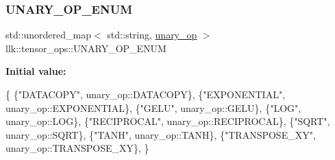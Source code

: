 \subsubsection{\texorpdfstring{U\+N\+A\+R\+Y\+\_\+\+O\+P\+\_\+\+E\+N\+UM}{UNARY\_OP\_ENUM}}
{\footnotesize\ttfamily std\+::unordered\+\_\+map$<$ std\+::string, \hyperlink{namespacellk_1_1tensor__ops_a5fae70cbcf6cd7aadca4a04278614633}{unary\+\_\+op} $>$ llk\+::tensor\+\_\+ops\+::\+U\+N\+A\+R\+Y\+\_\+\+O\+P\+\_\+\+E\+N\+UM}

{\bfseries Initial value\+:}
\begin{DoxyCode}
\{
    \{\textcolor{stringliteral}{"DATACOPY"}, unary\_op::DATACOPY\},
    \{\textcolor{stringliteral}{"EXPONENTIAL"}, unary\_op::EXPONENTIAL\},
    \{\textcolor{stringliteral}{"GELU"}, unary\_op::GELU\},
    \{\textcolor{stringliteral}{"LOG"}, unary\_op::LOG\},
    \{\textcolor{stringliteral}{"RECIPROCAL"}, unary\_op::RECIPROCAL\},
    \{\textcolor{stringliteral}{"SQRT"}, unary\_op::SQRT\},
    \{\textcolor{stringliteral}{"TANH"}, unary\_op::TANH\},
    \{\textcolor{stringliteral}{"TRANSPOSE\_XY"}, unary\_op::TRANSPOSE\_XY\},
\}
\end{DoxyCode}
